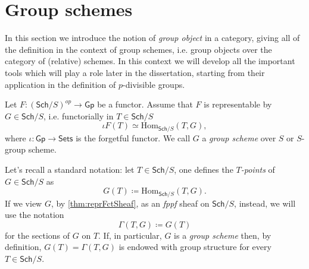 \section{Group schemes}
In this section we introduce the notion of {\em group object}
in a category, giving all of the definition in the context
of group schemes, i.e. group objects over the category of (relative) schemes.
In this context we will develop all the important tools which will play a role
later in the dissertation, starting from their application in the definition of
$p$-divisible groups.


\begin{defn}
	Let $F\colon (\mathsf{Sch}/S)^{op} \to \mathsf{Gp}$ be a functor.
	Assume that $F$ is representable by $G \in \mathsf{Sch}/S$, i.e. 
	functorially in $T \in \mathsf{Sch}/S$
	\begin{equation*}
		\iota F(T) \simeq \mathrm{Hom}_{\mathsf{Sch}/S} \left( T, G \right)
	,\end{equation*} 
	where $\iota\colon \mathsf{Gp} \to \mathsf{Sets}$ is the forgetful functor.
	We call $G$ a {\em group scheme} over $S$
	or $S$-group scheme.
\end{defn}


\begin{rem}
	Let's recall a standard notation: let $T \in \mathsf{Sch}/S$, one defines
	the {\em $T$-points} of $G \in \mathsf{Sch}/S$ as
	\begin{equation*}
		G(T) \coloneqq \mathrm{Hom}_{\mathsf{Sch}/S} \left( T, G \right)
	.\end{equation*} 
	If we view $G$, by \cref{thm:reprFctSheaf}, as an {\em fppf} sheaf on $\mathsf{Sch}/S$, instead,
	we will use the notation
	\begin{equation*}
		\Gamma \left( T, G \right) \coloneqq G(T)
	\end{equation*}
	for the sections of $G$ on $T$.
	If, in particular, $G$ is a {\em group scheme} then, by definition,
	$G(T) = \Gamma(T,G)$ is endowed with group structure for every $T \in \mathsf{Sch}/S$.
\end{rem}


